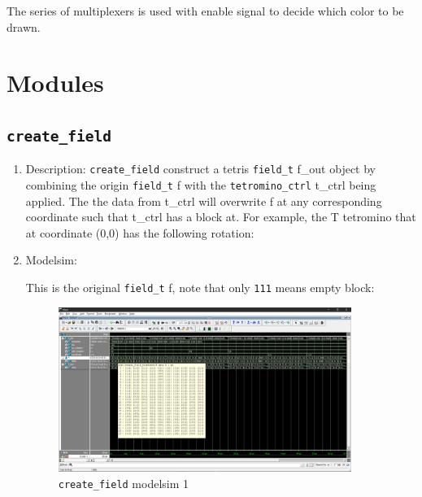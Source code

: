 \documentclass[scale = 0.9]{article}
\let\oldsection\section
\renewcommand\section{\clearpage\oldsection}
\newcommand{\code}[1]{\colorbox{light-gray}{\texttt{#1}}} %
\begin{document}
The series of multiplexers is used with enable signal to decide which color to be drawn.


\section{Modules}

\subsection{\code{create\_field}}

\begin{enumerate}[label=(\alph*)]
  \item Description:
        \code{create\_field} construct a tetris \code{field\_t} f\_out object by combining the origin
        \code{field\_t} f with the \code{tetromino\_ctrl} t\_ctrl being applied. The the data from
        t\_ctrl will overwrite f at any corresponding coordinate such that t\_ctrl has a block at.
        For example, the T tetromino that at coordinate (0,0) has the following rotation:
  \item Modelsim:

        This is the original \code{field\_t} f, note that only \code{111} means empty block:
        \begin{figure}[H]
          \begin{center}
            \includegraphics[width=0.9\textwidth]{create_field_1.png}
            \caption{\code{create\_field} modelsim 1}\label{create_field_1}
          \end{center}
        \end{figure}


\end{enumerate}
\end{document}
